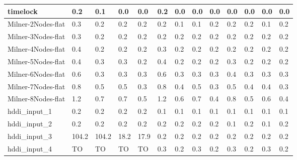 \begin{table}
\begin{adjustbox}{max totalheight=\textheight}
\begin{tabular}{|l|llllllllllll|}
    timelock           & 0.2      & 0.1      & 0.0      & 0.0      & 0.2   & 0.0  & 0.0   & 0.0  & 0.0               & 0.0               & 0.0               & 0.0               \\ \hline
    Milner-2Nodes-flat & 0.3      & 0.2      & 0.2      & 0.2      & 0.2   & 0.1  & 0.1   & 0.2  & 0.2               & 0.2               & 0.1               & 0.2               \\
    Milner-3Nodes-flat & 0.3      & 0.2      & 0.2      & 0.2      & 0.2   & 0.2  & 0.2   & 0.2  & 0.2               & 0.2               & 0.2               & 0.2               \\
    Milner-4Nodes-flat & 0.4      & 0.2      & 0.2      & 0.2      & 0.3   & 0.2  & 0.2   & 0.2  & 0.2               & 0.2               & 0.2               & 0.2               \\
    Milner-5Nodes-flat & 0.4      & 0.3      & 0.3      & 0.2      & 0.4   & 0.2  & 0.2   & 0.2  & 0.3               & 0.2               & 0.2               & 0.2               \\
    Milner-6Nodes-flat & 0.6      & 0.3      & 0.3      & 0.3      & 0.6   & 0.3  & 0.3   & 0.3  & 0.4               & 0.3               & 0.3               & 0.3               \\
    Milner-7Nodes-flat & 0.8      & 0.5      & 0.5      & 0.3      & 0.8   & 0.4  & 0.5   & 0.3  & 0.5               & 0.4               & 0.4               & 0.3               \\
    Milner-8Nodes-flat & 1.2      & 0.7      & 0.7      & 0.5      & 1.2   & 0.6  & 0.7   & 0.4  & 0.8               & 0.5               & 0.6               & 0.4               \\ \hline
    hddi\_input\_1     & 0.2      & 0.2      & 0.2      & 0.2      & 0.1   & 0.1  & 0.1   & 0.1  & 0.1               & 0.1               & 0.1               & 0.1               \\
    hddi\_input\_2     & 0.2      & 0.2      & 0.2      & 0.2      & 0.2   & 0.2  & 0.2   & 0.2  & 0.1               & 0.2               & 0.1               & 0.2               \\
    hddi\_input\_3     & 104.2    & 104.2    & 18.2     & 17.9     & 0.2   & 0.2  & 0.2   & 0.2  & 0.2               & 0.2               & 0.2               & 0.2               \\
    hddi\_input\_4     & TO       & TO       & TO       & TO       & 0.3   & 0.2  & 0.3   & 0.2  & 0.3               & 0.2               & 0.3               & 0.2               \\

\end{tabular}
\end{adjustbox}
\end{table}
